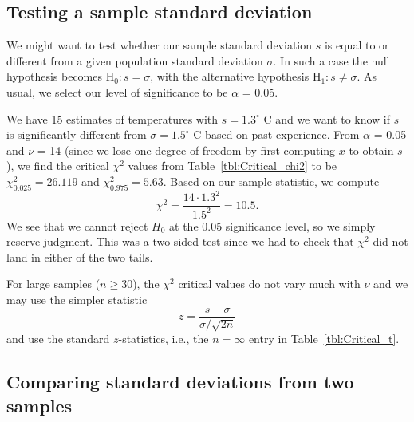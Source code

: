 \subsection{Testing a sample standard deviation}

	We might want to test whether our sample standard deviation $s$ is equal to or different from a 
given population standard deviation $\sigma$.  In such a case the null hypothesis becomes H$_0: s = \sigma$, with the alternative 
hypothesis H$_1: s \neq \sigma$.  As usual, we select our level of significance to be $\alpha$ = 0.05.
\begin{example}
	We have 15 estimates of temperatures with $s = 1.3^\circ$ C and we want to know if $s$ is 
significantly different from $\sigma = 1.5^\circ$ C based on past experience.  From $\alpha$ = 0.05 and $\nu$ = 14 (since we
lose one degree of freedom by first computing $\bar{x}$ to obtain $s$), we find the 
critical $\chi^2$ values from Table~\ref{tbl:Critical_chi2} to be $\chi^2_{0.025} = 26.119$ and $\chi^2_{0.975} = 5.63$. Based on our sample 
statistic, we compute
\begin{equation}
\chi^2=\frac{14\cdot1.3^2}{1.5^2}=10.5.
\end{equation}
We see that we cannot reject $H_0$ at the 0.05 significance level, so we simply
reserve judgment.  This was a two-sided test since we had to check that $\chi^2$  did not land in 
either of the two tails.
\end{example}

	For large samples ($n \geq 30$), the $\chi^2$ critical values do not vary much with $\nu$ and we may use the simpler statistic
\begin{equation}
z=\frac{s-\sigma}{\sigma/\sqrt{2n}}
\end{equation}
and use the standard $z$-statistics, i.e., the $n = \infty$ entry in Table~\ref{tbl:Critical_t}.

\subsection{Comparing standard deviations from two samples}
\label{sec:twostd}

